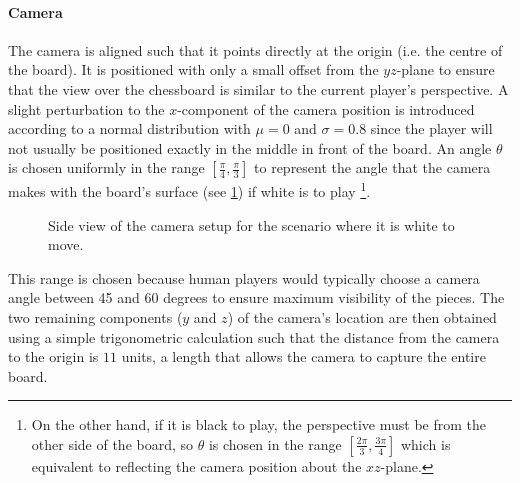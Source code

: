 \documentclass[../main.tex]{subfiles}
\begin{document}
\paragraph{Camera}
The camera is aligned such that it points directly at the origin (i.e. the centre of the board).
It is positioned with only a small offset from the $yz$-plane to ensure that the view over the chessboard is similar to the current player's perspective. 
A slight perturbation to the $x$-component of the camera position is introduced according to a normal distribution with $\mu=0$ and $\sigma=0.8$ since the player will not usually be positioned exactly in the middle in front of the board.
An angle $\theta$ is chosen uniformly in the range $\left[\frac{\pi}{4},\frac{\pi}{3}\right]$ to represent the angle that the camera makes with the board's surface (see \cref{fig:camera_angle}) if white is to play%
\footnote{On the other hand, if it is black to play, the perspective must be from the other side of the board, so $\theta$ is chosen in the range $\left[\frac{2\pi}{3},\frac{3\pi}{4}\right]$ which is equivalent to reflecting the camera position about the $xz$-plane.}.
\begin{figure}
    \centering
    \caption{Side view of the camera setup for the scenario where it is white to move. }
    \label{fig:camera_angle}
\end{figure}
This range is chosen because human players would typically choose a camera angle between 45 and 60 degrees to ensure maximum visibility of the pieces.
The two remaining components ($y$ and $z$) of the camera's location are then obtained using a simple trigonometric calculation such that the distance from the camera to the origin is $11$ units, a length that allows the camera to capture the entire board.
\end{document}

